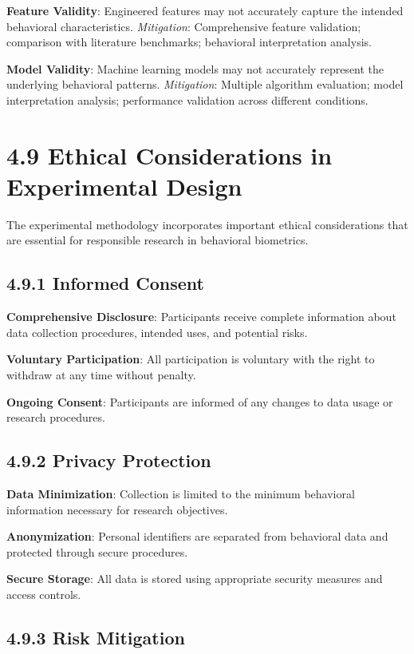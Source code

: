\documentclass[
  12pt,
  a4paper,
]{report}
\begin{document}
\textbf{Feature Validity}: Engineered features may not accurately
capture the intended behavioral characteristics. \emph{Mitigation}:
Comprehensive feature validation; comparison with literature benchmarks;
behavioral interpretation analysis.

\textbf{Model Validity}: Machine learning models may not accurately
represent the underlying behavioral patterns. \emph{Mitigation}:
Multiple algorithm evaluation; model interpretation analysis;
performance validation across different conditions.

\section{4.9 Ethical Considerations in Experimental
Design}\label{ethical-considerations-in-experimental-design}

The experimental methodology incorporates important ethical
considerations that are essential for responsible research in behavioral
biometrics.

\subsection{4.9.1 Informed Consent}\label{informed-consent}

\textbf{Comprehensive Disclosure}: Participants receive complete
information about data collection procedures, intended uses, and
potential risks.

\textbf{Voluntary Participation}: All participation is voluntary with
the right to withdraw at any time without penalty.

\textbf{Ongoing Consent}: Participants are informed of any changes to
data usage or research procedures.

\subsection{4.9.2 Privacy Protection}\label{privacy-protection}

\textbf{Data Minimization}: Collection is limited to the minimum
behavioral information necessary for research objectives.

\textbf{Anonymization}: Personal identifiers are separated from
behavioral data and protected through secure procedures.

\textbf{Secure Storage}: All data is stored using appropriate security
measures and access controls.

\subsection{4.9.3 Risk Mitigation}\label{risk-mitigation}
\end{document}
